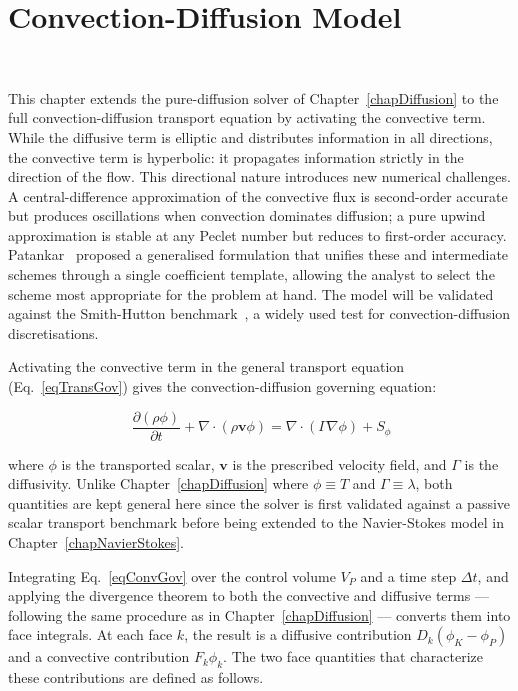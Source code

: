 \section{Convection-Diffusion Model}~\label{chapConvection}

This chapter extends the pure-diffusion solver of Chapter~\ref{chapDiffusion} to the full convection-diffusion transport equation by activating the convective term. While the diffusive term is elliptic and distributes information in all directions, the convective term is hyperbolic: it propagates information strictly in the direction of the flow. This directional nature introduces new numerical challenges. A central-difference approximation of the convective flux is second-order accurate but produces oscillations when convection dominates diffusion; a pure upwind approximation is stable at any Peclet number but reduces to first-order accuracy. Patankar~\cite{Patankar} proposed a generalised formulation that unifies these and intermediate schemes through a single coefficient template, allowing the analyst to select the scheme most appropriate for the problem at hand. The model will be validated against the Smith-Hutton benchmark~\cite{SmithHutton1982}, a widely used test for convection-diffusion discretisations.

Activating the convective term in the general transport equation (Eq.~\eqref{eqTransGov}) gives the convection-diffusion governing equation:

\begin{equation}~\label{eqConvGov}
    \frac{\partial (\rho \phi)}{\partial t} + \nabla \cdot (\rho \mathbf{v} \phi) = \nabla \cdot (\Gamma \nabla \phi) + S_\phi
\end{equation}

where $\phi$ is the transported scalar, $\mathbf{v}$ is the prescribed velocity field, and $\Gamma$ is the diffusivity. Unlike Chapter~\ref{chapDiffusion} where $\phi \equiv T$ and $\Gamma \equiv \lambda$, both quantities are kept general here since the solver is first validated against a passive scalar transport benchmark before being extended to the Navier-Stokes model in Chapter~\ref{chapNavierStokes}.

Integrating Eq.~\eqref{eqConvGov} over the control volume $V_P$ and a time step $\Delta t$, and applying the divergence theorem to both the convective and diffusive terms — following the same procedure as in Chapter~\ref{chapDiffusion} — converts them into face integrals. At each face $k$, the result is a diffusive contribution $D_k(\phi_K - \phi_P)$ and a convective contribution $F_k \phi_k$. The two face quantities that characterize these contributions are defined as follows.

